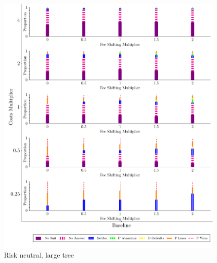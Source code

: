 \documentclass{article}
\begin{document}
\begin{figure}
    \centering
    \begin{minipage}{0.24\textwidth}
        \centering
        \includegraphics[scale=0.15, trim={0in 0in 0in 0in}, clip]{../Figures/Disposition Baseline.pdf}
		\caption{Risk neutral, large tree}
		\label{fig:treesize_panel1}
    \end{minipage}\hfill
    \begin{minipage}{0.24\textwidth}
        \centering

\end{minipage}
\end{figure}
\end{document}
